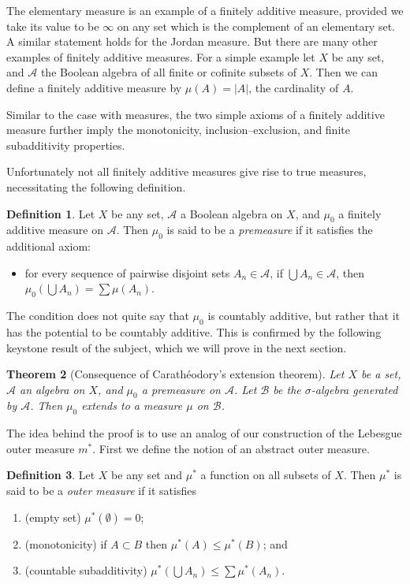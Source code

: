 \documentclass[11pt,oneside]{amsbook}
\theoremstyle{definition}
\theoremstyle{plain}
\newtheorem{thm}{Theorem}[section]
\theoremstyle{definition}
\newtheorem{defn}[thm]{Definition}
\theoremstyle{remark}
\numberwithin{equation}{section}
\numberwithin{figure}{section}
\begin{document}
The elementary measure is an example of a finitely additive measure, provided we take its value to be $\infty$ on any set which is the complement of an elementary set. A similar statement holds for the Jordan measure. But there are many other examples of finitely additive measures. For a simple example let $X$ be any set, and $\mathcal A$ the Boolean algebra of all finite or cofinite subsets of $X$. Then we can define a finitely additive measure by $\mu(A)=|A|$, the cardinality of $A$.

Similar to the case with measures, the two simple axioms of a finitely additive measure further imply the monotonicity, inclusion--exclusion, and finite subadditivity properties.

Unfortunately not all finitely additive measures give rise to true measures, necessitating the following definition.

\begin{defn}
  Let $X$ be any set, $\mathcal A$ a Boolean algebra on $X$, and $\mu_0$ a finitely additive measure on $\mathcal A$. Then $\mu_0$ is said to be a \emph{premeasure} if it satisfies the additional axiom:
  \begin{itemize}
  \item for every sequence of pairwise disjoint sets $A_n\in\mathcal A$, if $\bigcup A_n\in\mathcal A$, then $\mu_0(\bigcup A_n)=\sum\mu(A_n)$.
  \end{itemize}
\end{defn}

The condition does not quite say that $\mu_0$ is countably additive, but rather that it has the potential to be countably additive. This is confirmed by the following keystone result of the subject, which we will prove in the next section.

\begin{thm}[Consequence of Carath\'eodory's extension theorem]
  Let $X$ be a set, $\mathcal A$ an algebra on $X$, and $\mu_0$ a premeasure on $\mathcal A$. Let $\mathcal B$ be the $\sigma$-algebra generated by $\mathcal A$. Then $\mu_0$ extends to a measure $\mu$ on $\mathcal B$.
\end{thm}

The idea behind the proof is to use an analog of our construction of the Lebesgue outer measure $m^*$. First we define the notion of an abstract outer measure.

\begin{defn}
  Let $X$ be any set and $\mu^*$ a function on all subsets of $X$. Then $\mu^*$ is said to be a \emph{outer measure} if it satisfies
  \begin{enumerate}
  \item (empty set) $\mu^*(\emptyset)=0$;
  \item (monotonicity) if $A\subset B$ then $\mu^*(A)\leq\mu^*(B)$; and
  \item (countable subadditivity) $\mu^*(\bigcup A_n)\leq\sum\mu^*(A_n)$.
  \end{enumerate}
\end{defn}
\end{document}

